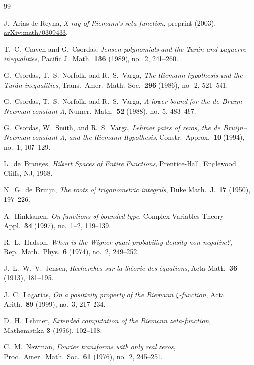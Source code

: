 \documentclass[11pt,reqno]{amsart}
\theoremstyle{plain}
\theoremstyle{definition}
\theoremstyle{remark}
\numberwithin{equation}{section}
\begin{document}
\begin{thebibliography}{99}

J.~Arias de Reyna, \emph{X-ray of Riemann's zeta-function}, preprint (2003), \href{https://arxiv.org/abs/math/0309433}{arXiv:math/0309433}.

T.~C.~Craven and G.~Csordas, \emph{Jensen polynomials and the Tur\'an and Laguerre inequalities}, Pacific J.\ Math.\ \textbf{136} (1989), no.~2, 241--260.

G.~Csordas, T.~S.~Norfolk, and R.~S.~Varga, \emph{The Riemann hypothesis and the Tur\'an inequalities}, Trans.\ Amer.\ Math.\ Soc.\ \textbf{296} (1986), no.~2, 521--541.

G.~Csordas, T.~S.~Norfolk, and R.~S.~Varga, \emph{A lower bound for the de~Bruijn--Newman constant $\Lambda$}, Numer.\ Math.\ \textbf{52} (1988), no.~5, 483--497.

G.~Csordas, W.~Smith, and R.~S.~Varga, \emph{Lehmer pairs of zeros, the de~Bruijn--Newman constant $\Lambda$, and the Riemann Hypothesis}, Constr.\ Approx.\ \textbf{10} (1994), no.~1, 107--129.

L.~de~Branges, \emph{Hilbert Spaces of Entire Functions}, Prentice-Hall, Englewood Cliffs, NJ, 1968.

N.~G.~de~Bruijn, \emph{The roots of trigonometric integrals}, Duke Math.\ J.\ \textbf{17} (1950), 197--226.

A.~Hinkkanen, \emph{On functions of bounded type}, Complex Variables Theory Appl.\ \textbf{34} (1997), no.~1--2, 119--139.

R.~L.~Hudson, \emph{When is the Wigner quasi-probability density non-negative?}, Rep.\ Math.\ Phys.\ \textbf{6} (1974), no.~2, 249--252.

J.~L.~W.~V.~Jensen, \emph{Recherches sur la th\'eorie des \'equations}, Acta Math.\ \textbf{36} (1913), 181--195.

J.~C.~Lagarias, \emph{On a positivity property of the Riemann $\xi$-function}, Acta Arith.\ \textbf{89} (1999), no.~3, 217--234.

D.~H.~Lehmer, \emph{Extended computation of the Riemann zeta-function}, Mathematika \textbf{3} (1956), 102--108.

C.~M.~Newman, \emph{Fourier transforms with only real zeros}, Proc.\ Amer.\ Math.\ Soc.\ \textbf{61} (1976), no.~2, 245--251.


\end{thebibliography}
\end{document}
